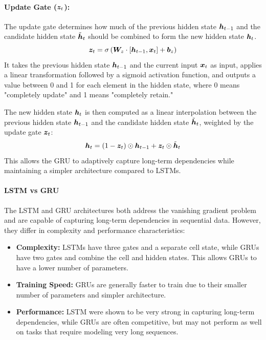 \paragraph{Update Gate ($\boldsymbol{z}_t$):}
The update gate determines how much of the previous hidden state $\boldsymbol{h}_{t-1}$ and the candidate hidden state $\tilde{\boldsymbol{h}}_t$ should be
combined to form the new hidden state $\boldsymbol{h}_t$.
\begin{equation}
    \boldsymbol{z}_t = \sigma\left(\boldsymbol{W}_z \cdot [\boldsymbol{h}_{t-1}, \boldsymbol{x}_t] + \boldsymbol{b}_z\right)
\end{equation}
It takes the previous hidden state $\boldsymbol{h}_{t-1}$ and the current input $\boldsymbol{x}_t$ as input, applies a linear transformation followed by a sigmoid activation function,
and outputs a value between 0 and 1 for each element in the hidden state, where 0 means "completely update" and 1 means "completely retain."

The new hidden state $\boldsymbol{h}_t$ is then computed as a linear interpolation between the previous hidden state $\boldsymbol{h}_{t-1}$ and the candidate hidden state $\tilde{\boldsymbol{h}}_t$,
weighted by the update gate $\boldsymbol{z}_t$:
\begin{equation}
    \boldsymbol{h}_t = (1 - \boldsymbol{z}_t) \odot \boldsymbol{h}_{t-1} + \boldsymbol{z}_t \odot \tilde{\boldsymbol{h}}_t
\end{equation}
This allows the GRU to adaptively capture long-term dependencies while maintaining a simpler architecture compared to LSTMs.

\paragraph{LSTM vs GRU}
The LSTM and GRU architectures both address the vanishing gradient problem and are capable of capturing long-term dependencies in sequential data.
However, they differ in complexity and performance characteristics:
\begin{itemize}
    \item \textbf{Complexity:} LSTMs have three gates and a separate cell state, while GRUs have two gates and combine the cell and hidden states.
    This allows GRUs to have a lower number of parameters.
    \item \textbf{Training Speed:} GRUs are generally faster to train due to their smaller number of parameters and simpler architecture.
    \item \textbf{Performance:} LSTM were shown to be very strong in capturing long-term dependencies, while GRUs are often competitive,
    but may not perform as well on tasks that require modeling very long sequences.
\end{itemize}

